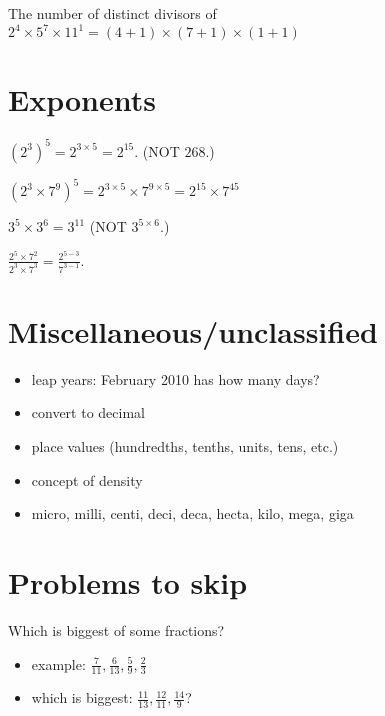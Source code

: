 \documentclass[fullpage,twocolumn]{article}
\begin{document}
The number of distinct divisors of $2^4\times 5^7 \times 11^1 = (4+1)\times(7+1)\times(1+1)$

\section{Exponents}

$(2^3)^5 = 2^{3 \times 5} = 2^{15}$. (NOT $26{8}$.)

$(2^3 \times 7^9)^5 = 2^{3 \times 5}  \times 7^{9 \times 5}= 2^{15} \times 7^{45}$

$3^5 \times 3^6 = 3^{11}$ (NOT $3^{5 \times 6}$.)

$\frac{2^5 \times 7^2}{2^3 \times 7^3} = \frac{2^{5-3}}{7^{3-1}}$.

\section{Miscellaneous/unclassified}
\begin{itemize}
\item leap years: February  2010 has how many days?
\item convert to decimal
\item place values (hundredths, tenths, units, tens, etc.)
\item concept of density
\item micro, milli, centi, deci, deca, hecta, kilo, mega, giga
\end{itemize} 



\section{Problems to skip}
Which is biggest of some fractions? 
\begin{itemize}
\item example: $\frac{7}{11}, \frac{6}{13}, \frac{5}{9}, \frac{2}{3}$
\item which is biggest: $\frac{11}{13}, \frac{12}{11}, \frac{14}{9}$?
\end{itemize} 

\end{document}
